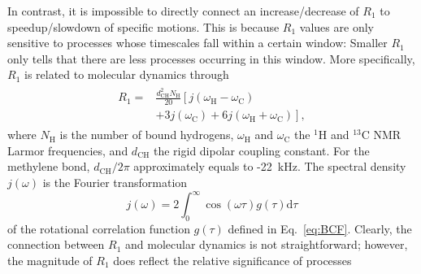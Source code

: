 \documentclass[journal=jcisd8,manuscript=article,layout=twocolumn]{achemso}
\begin{document}
In contrast, it is impossible to directly connect an increase/decrease of $R_1$ to speedup/slowdown of specific motions.
This is because $R_1$ values are only sensitive to processes whose timescales fall within a certain window:
Smaller $R_1$ only tells that there are less processes occurring in this window.
More specifically,
$R_1$ is related to molecular dynamics through
\begin{align}
\label{eq:R1}
\begin{split}
R_{1}=&\frac{d^2_{\mathrm{CH}}N_{\mathrm{H}}}{20}\left[j(\omega_{\mathrm{H}}-\omega_{\mathrm{C}})\right. \\
&\left.+3j(\omega_{\mathrm{C}})+6j(\omega_{\mathrm{H}}+\omega_{\mathrm{C}})\right] ,
\end{split}
\end{align}
where $N_{\mathrm{H}}$ is the number of bound hydrogens, $\omega_{\mathrm{H}}$ and $\omega_{\mathrm{C}}$ the $^1$H and $^{13}$C NMR Larmor frequencies, and $d_{\mathrm{CH}}$ the rigid dipolar coupling constant. For the methylene bond, $d_{\mathrm{CH}}/2\pi$ approximately equals to -22~kHz.
The spectral density $j(\omega)$ is the Fourier transformation
\begin{equation}
j{(\omega)}=2\int_{0}^{\infty}\cos(\omega\tau)g(\tau)\mathrm d\tau
\end{equation}
of the rotational correlation function $g(\tau)$ defined in Eq.~\eqref{eq:BCF}.
Clearly, the connection between $R_1$ and molecular dynamics is not straightforward;
however, the magnitude of $R_1$ does reflect the relative significance of processes
\end{document}
